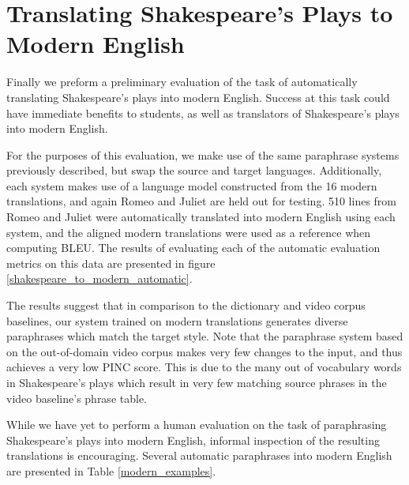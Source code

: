 \documentclass[10pt,a5paper,twoside]{article}
\begin{document}
\section{Translating Shakespeare's Plays to Modern English}
Finally we preform a preliminary evaluation of the task of automatically translating Shakespeare's plays into modern English.  Success at this task could have immediate
benefits to students, as well as translators of Shakespeare's plays into modern English. 

For the purposes of this evaluation, 
we make use of the same paraphrase systems previously described, but swap the source and target languages.
Additionally, each system makes use of a language model constructed from the 16 modern translations, and again Romeo and Juliet are held out for testing.  
510 lines from Romeo and Juliet were automatically translated into modern English using each system, and the aligned modern 
translations were used as a reference when computing BLEU.  The results of evaluating each of the automatic evaluation metrics on this
data are presented in figure \ref{shakespeare_to_modern_automatic}.  

The results suggest that in comparison to the dictionary and video corpus baselines, 
our system trained on modern translations generates diverse paraphrases which match the target style.
Note that the paraphrase system 
based on the out-of-domain video corpus makes very few changes to the input, and thus achieves a very low PINC score.  This is due to the many out of
vocabulary words in Shakespeare's plays which result in very few matching source phrases in the video baseline's phrase table.

While we have yet to perform a human evaluation on the task of paraphrasing Shakespeare's plays into modern English, 
informal inspection of the resulting translations is encouraging.  Several automatic paraphrases into modern English are presented in Table \ref{modern_examples}.
\end{document}

